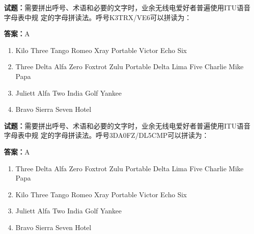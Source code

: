 \documentclass{ctexbook}
\begin{document}




\vspace{1em}

\textbf{试题：}需要拼出呼号、术语和必要的文字时，业余无线电爱好者普遍使用ITU语音字母表中规
定的字母拼读法。呼号K3TRX/VE6可以拼读为： 

\textbf{答案：}A 

\begin{enumerate}[leftmargin=3em]
  \item Kilo Three Tango Romeo Xray Portable Victor Echo Six 

  \item Three Delta Alfa Zero Foxtrot Zulu Portable Delta Lima Five Charlie Mike Papa 

  \item Juliett Alfa Two India Golf Yankee 

  \item Bravo Sierra Seven Hotel 

\end{enumerate}





\vspace{1em}

\textbf{试题：}需要拼出呼号、术语和必要的文字时，业余无线电爱好者普遍使用ITU语音字母表中规
定的字母拼读法。呼号3DA0FZ/DL5CMP可以拼读为： 

\textbf{答案：}A 

\begin{enumerate}[leftmargin=3em]
  \item Three Delta Alfa Zero Foxtrot Zulu Portable Delta Lima Five Charlie Mike Papa 

  \item Kilo Three Tango Romeo Xray Portable Victor Echo Six 

  \item Juliett Alfa Two India Golf Yankee 

  \item Bravo Sierra Seven Hotel 

\end{enumerate}





\vspace{1em}
\end{document}
